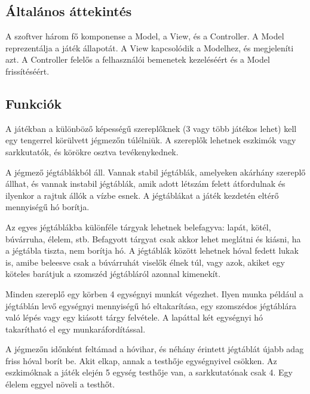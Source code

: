 \subsection{Általános áttekintés}
A szoftver három fő komponense a Model, a View, és a Controller. A Model reprezentálja a játék állapotát. A View kapcsolódik a Modelhez, és megjeleníti azt. A Controller felelős a felhasználói bemenetek kezeléséért és a Model frissítéséért.

\subsection{Funkciók}
A játékban a különböző képességű szereplőknek (3 vagy több játékos lehet) kell egy tengerrel körülvett jégmezőn túlélniük. A szereplők lehetnek eszkimók vagy sarkkutatók, és körökre osztva tevékenykednek.

A jégmező jégtáblákból áll. Vannak stabil jégtáblák, amelyeken akárhány szereplő állhat, és vannak instabil jégtáblák, amik adott létszám felett átfordulnak és ilyenkor a rajtuk állók a vízbe esnek. A jégtáblákat a játék kezdetén eltérő mennyiségű hó borítja.

Az egyes jégtáblákba különféle tárgyak lehetnek belefagyva: lapát, kötél, búvárruha, élelem, stb. Befagyott tárgyat csak akkor lehet meglátni és kiásni, ha a jégtábla tiszta, nem borítja hó. A jégtáblák között lehetnek hóval fedett lukak is, amibe beleesve csak a búvárruhát viselők élnek túl, vagy azok, akiket egy köteles barátjuk a szomszéd jégtábláról azonnal kimenekít.

Minden szereplő egy körben 4 egységnyi munkát végezhet. Ilyen munka például a jégtáblán levő egységnyi mennyiségű hó eltakarítása, egy szomszédos jégtáblára való lépés vagy egy kiásott tárgy felvétele. A lapáttal két egységnyi hó takarítható el egy munkaráfordítással.

A jégmezőn időnként feltámad a hóvihar, és néhány érintett jégtáblát újabb adag friss hóval borít be. Akit elkap, annak a testhője egységnyivel csökken. Az eszkimóknak a játék elején 5 egység testhője van, a sarkkutatónak csak 4. Egy élelem eggyel növeli a testhőt.

